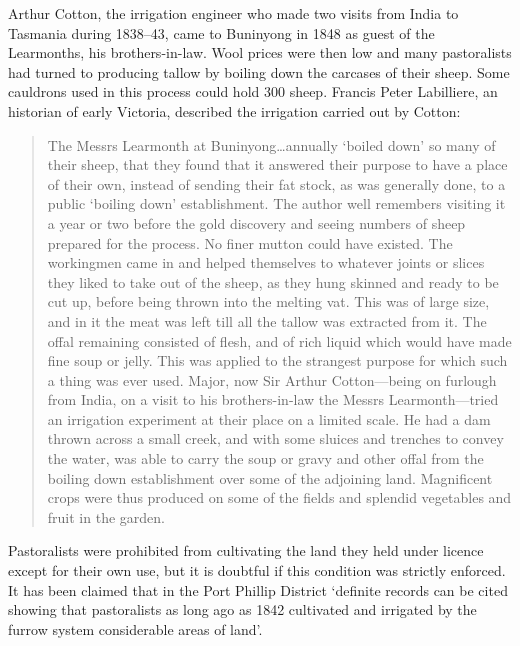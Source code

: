 Arthur Cotton, the irrigation engineer who made two visits from India
to Tasmania during 1838--43, came to Buninyong in 1848 as guest of the
Learmonths, his brothers-in-law.  Wool prices were then low and many
pastoralists had turned to producing tallow by boiling down the
carcases of their sheep.  Some cauldrons used in this process could
hold 300 sheep.  Francis Peter Labilliere, an
historian of early Victoria, described the irrigation carried out by
Cotton:
\begin{quote}
	The Messrs Learmonth at Buninyong\ldots annually `boiled down'
	so many of their sheep, that they found that it answered their
	purpose to have a place of their own, instead of sending their
	fat stock, as was generally done, to a public `boiling down'
	establishment.  The author well remembers visiting it a year
	or two before the gold discovery and seeing numbers of sheep
	prepared for the process.  No finer mutton could have existed.
	The workingmen came in and helped themselves to whatever
	joints or slices they liked to take out of the sheep, as they
	hung skinned and ready to be cut up, before being thrown into
	the melting vat.  This was of large size, and in it the meat
	was left till all the tallow was extracted from it.  The offal
	remaining consisted of flesh, and of rich liquid which would
	have made fine soup or jelly.  This was applied to the
	strangest purpose for which such a thing was ever used.
	Major, now Sir Arthur Cotton---being on furlough from India,
	on a visit to his brothers-in-law the Messrs Learmonth---tried
	an irrigation experiment at their place on a limited scale.
	He had a dam thrown across a small creek, and with some
	sluices and trenches to convey the water, was able to carry
	the soup or gravy and other offal from the boiling down
	establishment over some of the adjoining land.  Magnificent
	crops were thus produced on some of the fields and splendid
	vegetables and fruit in the
	garden.
\end{quote}

Pastoralists were prohibited from cultivating the land they held under
licence except for their own use, but it is doubtful if this condition
was strictly enforced.  It has been claimed that in the Port Phillip
District `definite records can be cited showing that pastoralists as
long ago as 1842 cultivated and irrigated by the furrow system
considerable areas of land'.

